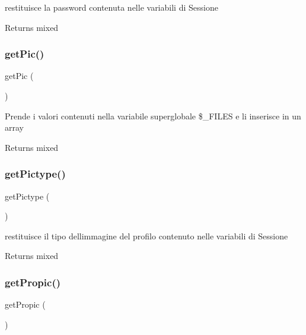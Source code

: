 restituisce la password contenuta nelle variabili di Sessione

\begin{DoxyReturn}{Returns}
mixed 
\end{DoxyReturn}
\mbox{\label{class_v_utente_a218c2a53843b2af2e9b28c40d67b5914}} 
\subsubsection{\texorpdfstring{get\+Pic()}{getPic()}}
{\footnotesize\ttfamily get\+Pic (\begin{DoxyParamCaption}{ }\end{DoxyParamCaption})}

Prende i valori contenuti nella variabile superglobale \$\+\_\+\+F\+I\+L\+ES e li inserisce in un array

\begin{DoxyReturn}{Returns}
mixed 
\end{DoxyReturn}
\mbox{\label{class_v_utente_ad7692598156e778e9c744ed7b32877fd}} 
\subsubsection{\texorpdfstring{get\+Pictype()}{getPictype()}}
{\footnotesize\ttfamily get\+Pictype (\begin{DoxyParamCaption}{ }\end{DoxyParamCaption})}

restituisce il tipo dell\textquotesingle{}immagine del profilo contenuto nelle variabili di Sessione

\begin{DoxyReturn}{Returns}
mixed 
\end{DoxyReturn}
\mbox{\label{class_v_utente_afb77cb35ab7e2fba8cb983fbbbb8bfd8}} 
\subsubsection{\texorpdfstring{get\+Propic()}{getPropic()}}
{\footnotesize\ttfamily get\+Propic (\begin{DoxyParamCaption}{ }\end{DoxyParamCaption})}

